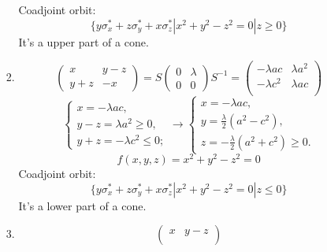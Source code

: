 \documentclass[12pt]{article}
\theoremstyle{definition}
\begin{document}
\begin{enumerate}
\begin{itemize}
\begin{enumerate}
        Coadjoint orbit:
        \begin{equation}
            \{y\sigma^*_x+z\sigma^*_y+x\sigma^*_z|x^2+y^2-z^2=0|z\geq0\}
        \end{equation}
        It's a upper part of a cone.
    \item 
        \begin{equation}
            \begin{pmatrix}
            x & y-z \\
            y+z & -x
        \end{pmatrix}=
        S \begin{pmatrix}
            0 & \lambda\\
            0 & 0
        \end{pmatrix}  S^{-1}= 
        \begin{pmatrix}
            -\lambda ac & \lambda a^2\\
            -\lambda c^2 & \lambda ac\\
        \end{pmatrix}
        \end{equation}
        \begin{equation}
            \begin{cases}
                x=-\lambda ac,\\
                y-z=\lambda a^2\geq0,\\
                y+z=-\lambda c^2\leq0;
            \end{cases}\rightarrow\begin{cases}
                x=-\lambda ac,\\
                y=\frac{\lambda}{2}(a^2-c^2),\\
                z=-\frac{\lambda}{2}(a^2+c^2)\geq0.
            \end{cases}
        \end{equation}
        \begin{equation}
            f(x,y,z)=x^2+y^2-z^2=0
        \end{equation}
        Coadjoint orbit:
        \begin{equation}
            \{y\sigma^*_x+z\sigma^*_y+x\sigma^*_z|x^2+y^2-z^2=0|z\leq0\}
        \end{equation}
        It's a lower part of a cone.
    \item 
        \begin{equation}
            \begin{pmatrix}
            x & y-z \\

\end{pmatrix}
\end{equation}
\end{enumerate}
\end{itemize}
\end{enumerate}
\end{document}
